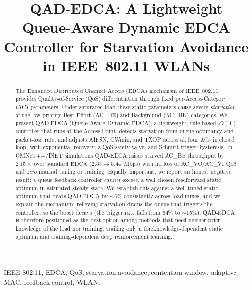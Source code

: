 \documentclass[conference]{IEEEtran}
\newcommand{\AC}[1]{AC\_#1}
\begin{document}
\title{QAD-EDCA: A Lightweight Queue-Aware Dynamic EDCA Controller for
Starvation Avoidance in IEEE~802.11 WLANs}

\author{
}

\maketitle

\begin{abstract}
The Enhanced Distributed Channel Access (EDCA) mechanism of IEEE~802.11
provides Quality-of-Service (QoS) differentiation through fixed per-Access-Category
(AC) parameters. Under saturated load these static parameters cause severe
\emph{starvation} of the low-priority Best-Effort (\AC{BE}) and
Background (\AC{BK}) categories. We present QAD-EDCA (Queue-Aware Dynamic
EDCA), a lightweight, rule-based, $O(1)$ controller that runs at the Access
Point, detects starvation from queue occupancy and packet-loss rate, and
adjusts AIFSN, CWmin, and TXOP across all four ACs in closed loop, with
exponential recovery, a QoS safety valve, and Schmitt-trigger hysteresis.
In OMNeT++/INET simulations QAD-EDCA raises starved \AC{BE} throughput by
$2.15\times$ over standard EDCA (2.53$\rightarrow$5.44~Mbps) with no loss of
\AC{VO}/\AC{VI} QoS and \emph{zero} manual tuning or training. Equally important, we report an honest negative result: a
queue-feedback controller \emph{cannot} exceed a well-chosen feedforward
static optimum in saturated steady state. We establish this against a
well-tuned static optimum that beats QAD-EDCA by $\sim$6\% consistently across
load mixes, and we explain the
mechanism: relieving starvation drains the queue that triggers the
controller, so the boost decays (the trigger rate falls from 64\% to
$\sim$15\%). QAD-EDCA is therefore positioned as the best option
among methods that need neither prior knowledge of the load nor training,
trailing only a foreknowledge-dependent static optimum and training-dependent
deep reinforcement learning.
\end{abstract}

\begin{IEEEkeywords}
IEEE 802.11, EDCA, QoS, starvation avoidance, contention window, adaptive
MAC, feedback control, WLAN.
\end{IEEEkeywords}
\end{document}
